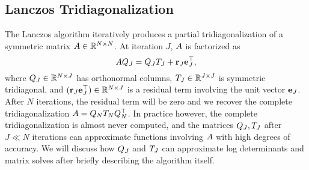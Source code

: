 

\subsection{Lanczos Tridiagonalization}
\label{sec:lanczos}

The Lanczos algorithm \cite{lanczos1950iteration} iteratively produces a partial tridiagonalization of a symmetric matrix $A \in \mathbb{R}^{N \times N}$.
At iteration $J$, $A$ is factorized as
%
\begin{equation}
  A Q_J = Q_J T_J + \mathbf{r}_J \mathbf{e}_J^\top,
  \label{eqn:lanczos}
\end{equation}
%
where $Q_J \in \mathbb{R}^{N \times J}$ has orthonormal columns, $T_J \in \mathbb{R}^{J \times J}$ is symmetric tridiagonal, and $(\mathbf{r}_J \mathbf{e}_J^\top) \in \mathbb{R}^{N \times J}$ is a residual term involving the unit vector $\mathbf{e}_J$.
After $N$ iterations, the residual term will be zero and we recover the complete tridiagonalization $A = Q_N T_N Q^\top_N$.
In practice however, the complete tridiagonalization is almost never computed, and the matrices $Q_J, T_J$ after $J \ll N$ iterations can approximate functions involving $A$ with high degrees of accuracy.
We will discuss how $Q_J$ and $T_J$ can approximate log determinants and matrix solves after briefly describing the algorithm itself.

